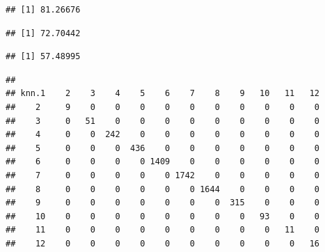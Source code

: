 \documentclass[]{article}
\newenvironment{Shaded}{\begin{snugshade}}{\end{snugshade}}
\newcommand{\KeywordTok}[1]{\textcolor[rgb]{0.13,0.29,0.53}{\textbf{{#1}}}}
\newcommand{\DecValTok}[1]{\textcolor[rgb]{0.00,0.00,0.81}{{#1}}}
\newcommand{\FloatTok}[1]{\textcolor[rgb]{0.00,0.00,0.81}{{#1}}}
\newcommand{\StringTok}[1]{\textcolor[rgb]{0.31,0.60,0.02}{{#1}}}
\newcommand{\CommentTok}[1]{\textcolor[rgb]{0.56,0.35,0.01}{\textit{{#1}}}}
\newcommand{\NormalTok}[1]{{#1}}
\begin{document}
\begin{Shaded}
\end{Shaded}

\begin{verbatim}
## [1] 81.26676
\end{verbatim}

\begin{Shaded}
\end{Shaded}

\begin{verbatim}
## [1] 72.70442
\end{verbatim}

\begin{Shaded}
\end{Shaded}

\begin{verbatim}
## [1] 57.48995
\end{verbatim}

\begin{Shaded}
\end{Shaded}

\begin{verbatim}
##      
## knn.1    2    3    4    5    6    7    8    9   10   11   12
##    2     9    0    0    0    0    0    0    0    0    0    0
##    3     0   51    0    0    0    0    0    0    0    0    0
##    4     0    0  242    0    0    0    0    0    0    0    0
##    5     0    0    0  436    0    0    0    0    0    0    0
##    6     0    0    0    0 1409    0    0    0    0    0    0
##    7     0    0    0    0    0 1742    0    0    0    0    0
##    8     0    0    0    0    0    0 1644    0    0    0    0
##    9     0    0    0    0    0    0    0  315    0    0    0
##    10    0    0    0    0    0    0    0    0   93    0    0
##    11    0    0    0    0    0    0    0    0    0   11    0
##    12    0    0    0    0    0    0    0    0    0    0   16
\end{verbatim}
\end{document}
